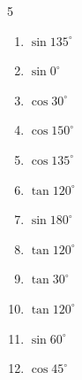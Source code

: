 \begin{multicols}{5}
\begin{enumerate}
        \phantom{$\displaystyle =0$}

  \item $\displaystyle \sin{135^\circ}$


  \item $\displaystyle \sin{0^\circ}$

        \phantom{$\displaystyle =0$}

  \item $\displaystyle \cos{30^\circ}$


  \item $\displaystyle \cos{150^\circ}$


  \item $\displaystyle \cos{135^\circ}$


\columnbreak %

  \item $\displaystyle \tan{120^\circ}$


  \item $\displaystyle \sin{180^\circ}$

        \phantom{$\displaystyle =0$}

  \item $\displaystyle \tan{120^\circ}$


  \item $\displaystyle \tan{30^\circ}$


  \item $\displaystyle \tan{120^\circ}$


  \item $\displaystyle \sin{60^\circ}$


  \item $\displaystyle \cos{45^\circ}$



\end{enumerate}
\end{multicols}

